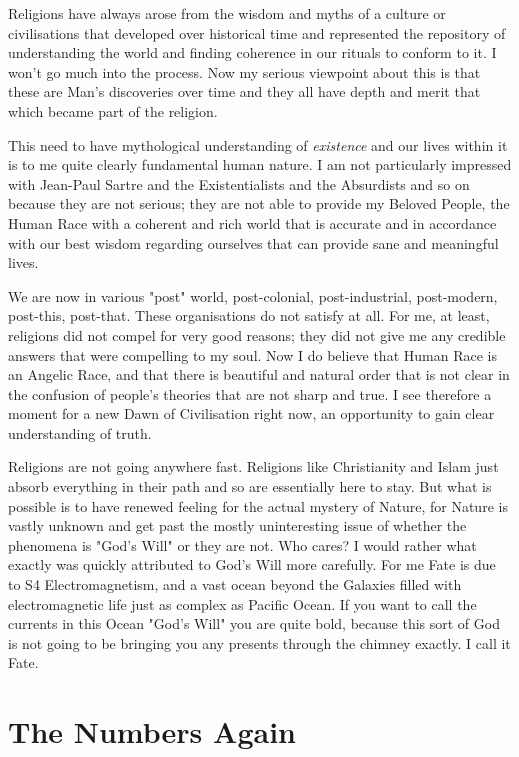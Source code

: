 \documentclass{amsart}
\begin{document}
Religions have always arose from the wisdom and myths of a culture or civilisations that developed over historical time and represented the repository of understanding the world and finding coherence in our rituals to conform to it.  I won't go much into the process.  Now my serious viewpoint about this is that these are Man's discoveries over time and they all have depth and merit that which became part of the religion.  

This need to have mythological understanding of {\em existence} and our lives within it is to me quite clearly fundamental human nature.  I am not particularly impressed with Jean-Paul Sartre and the Existentialists and the Absurdists and so on because they are not serious; they are not able to provide my Beloved People, the Human Race with a coherent and rich world that is accurate and in accordance with our best wisdom regarding ourselves that can provide sane and meaningful lives.  

We are now in various "post" world, post-colonial, post-industrial, post-modern, post-this, post-that. These organisations do not satisfy at all.  For me, at least, religions did not compel for very good reasons; they did not give me any credible answers that were compelling to my soul.  Now I do believe that Human Race is an Angelic Race, and that there is beautiful and natural order that is not clear in the confusion of people's theories that are not sharp and true.  I see therefore a moment for a new Dawn of Civilisation right now, an opportunity to gain clear understanding of truth.  

Religions are not going anywhere fast.  Religions like Christianity and Islam just absorb everything in their path and so are essentially here to stay.  But what is possible is to have renewed feeling for the actual mystery of Nature, for Nature is vastly unknown and get past the mostly uninteresting issue of whether the phenomena is "God's Will" or they are not.  Who cares?  I would rather what exactly was quickly attributed to God's Will more carefully.  For me Fate is due to S4 Electromagnetism, and a vast ocean beyond the Galaxies filled with electromagnetic life just as complex as Pacific Ocean.  If you want to call the currents in this Ocean "God's Will" you are quite bold, because this sort of God is not going to be bringing you any presents through the chimney exactly.  I call it Fate.

\section{The Numbers Again}
\end{document}
